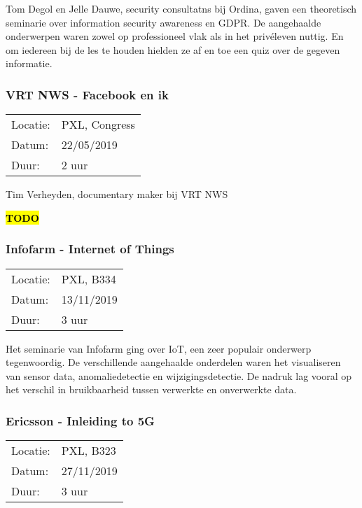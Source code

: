 Tom Degol en Jelle Dauwe, security consultatns bij Ordina, gaven een theoretisch seminarie over information security awareness en GDPR. De aangehaalde onderwerpen waren zowel op professioneel vlak als in het privéleven nuttig. En om iedereen bij de les te houden hielden ze af en toe een quiz over de gegeven informatie.

\subsubsection{VRT NWS - Facebook en ik}

\begin{tabular}{l l}
  Locatie: & PXL, Congress\\
  Datum: & 22/05/2019\\
  Duur: & 2 uur
\end{tabular}

Tim Verheyden, documentary maker bij VRT NWS

\hl{\textbf{TODO}}

\subsubsection{Infofarm - Internet of Things}

\begin{tabular}{l l}
  Locatie: & PXL, B334\\
  Datum: & 13/11/2019\\
  Duur: & 3 uur
\end{tabular}

Het seminarie van Infofarm ging over IoT, een zeer populair onderwerp tegenwoordig. De verschillende aangehaalde onderdelen waren het visualiseren van sensor data, anomaliedetectie en wijzigingsdetectie. De nadruk lag vooral op het verschil in bruikbaarheid tussen verwerkte en onverwerkte data.

\subsubsection{Ericsson - Inleiding to 5G}

\begin{tabular}{l l}
  Locatie: & PXL, B323\\
  Datum: & 27/11/2019\\
  Duur: & 3 uur
\end{tabular}

